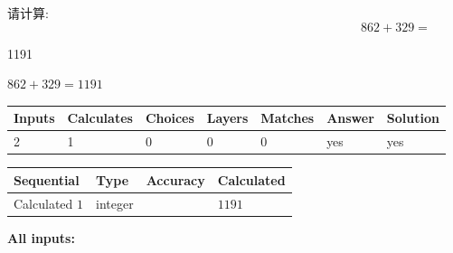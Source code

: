 \documentclass{ctexart}
\begin{document}
  
 
请计算:
\begin{equation}
862 +  %
329 = \nonumber
\end{equation}
 
 
 
\noindent{}
 
 

1191
 
 
\noindent{}
 
 

 
 
 
\noindent{}
 
 

$ %
862 +  %
329=   %
1191$
 
 
\noindent{}
 
 

 
   
   
   
   
\noindent\begin{tabular}{|l|l|l|l|l|l|l|}
 \hline
Inputs & Calculates & Choices & Layers & Matches & Answer & Solution \\ \hline
 2  & 
 1  & 
 0
  & 
 0  & 
 0  & 
  yes & 
  yes 
  \\ \hline
 \end{tabular}
   
   
   
   
\noindent{}
   
   
  
  
\noindent\begin{tabular}{|l|l|l|l|}
\hline
 Sequential & Type & Accuracy & Calculated \\ 
\hline
 
 
  Calculated $  1 $ & integer &  & 
  $ 1191 $ 
 \\  \hline  
 \end{tabular}
   
   
   
   
\noindent\vspace{0.1in}\hspace{-0.08in} {\textbf{\Large{All inputs: }}}
   
\end{document}
